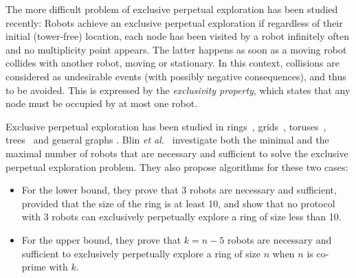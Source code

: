 The more difficult problem of exclusive perpetual exploration has been studied recently: 
Robots achieve an exclusive perpetual exploration if regardless of their initial (tower-free) location, each node has been visited by a robot infinitely often and no multiplicity point appears. The latter happens as soon as a moving robot collides with another robot, moving or stationary.
 In this context, collisions are considered as undesirable events (with possibly negative consequences), and thus to be avoided. This is expressed by the \emph{exclusivity property}, which states that any node must be occupied by at most one robot.

Exclusive perpetual exploration has been studied in rings~\cite{blin_exclusive_2010,navarraipdps2013}, grids~\cite{bonnet_asynchronous_2011,baldoni_solvability_2008}, toruses~\cite{devismeshal}, trees~\cite{BlinBN12} and general graphs \cite{baldoni_anonymous_2008,BlinBN13}. 
Blin \textit{et al.}~\cite{blin_exclusive_2010} investigate both the minimal and the maximal number of robots that are necessary and sufficient to solve the exclusive perpetual exploration problem. They also propose algorithms for these two cases:
\begin{itemize}
\item For the lower bound, they prove that 3 robots are necessary and sufficient, provided that the size of the ring is at least 10, and show that no protocol with 3 robots can exclusively perpetually explore a ring of size less than 10. 
\item For the upper bound, they prove that $k = n - 5$ robots are necessary and sufficient to exclusively perpetually explore a ring of size $n$ when $n$ is co-prime with $k$.
\end{itemize}


